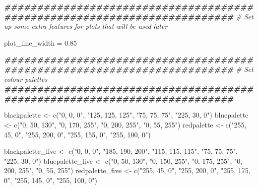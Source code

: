 \documentclass[
]{book}
\newenvironment{Shaded}{\begin{snugshade}}{\end{snugshade}}
\newcommand{\CommentTok}[1]{\textcolor[rgb]{0.56,0.35,0.01}{\textit{#1}}}
\newcommand{\DocumentationTok}[1]{\textcolor[rgb]{0.56,0.35,0.01}{\textbf{\textit{#1}}}}
\newcommand{\FloatTok}[1]{\textcolor[rgb]{0.00,0.00,0.81}{#1}}
\newcommand{\FunctionTok}[1]{\textcolor[rgb]{0.00,0.00,0.00}{#1}}
\newcommand{\NormalTok}[1]{#1}
\newcommand{\OtherTok}[1]{\textcolor[rgb]{0.56,0.35,0.01}{#1}}
\newcommand{\StringTok}[1]{\textcolor[rgb]{0.31,0.60,0.02}{#1}}
\begin{document}
\begin{Shaded}
\begin{Highlighting}[]
\DocumentationTok{\#\#\#\#\#\#\#\#\#\#\#\#\#\#\#\#\#\#\#\#\#\#\#\#\#\#\#\#\#\#\#\#\#\#\#\#\#\#\#\#\#\#\#\#\#\#\#\#\#\#\#\#\#\#\#\#\#\#\#\#\#\#\#\#\#\#\#\#\#\#\#\#\#}
\CommentTok{\# Set up some extra features for plots that will be used later}

\NormalTok{plot\_line\_width }\OtherTok{=} \FloatTok{0.85}

\DocumentationTok{\#\#\#\#\#\#\#\#\#\#\#\#\#\#\#\#\#\#\#\#\#\#\#\#\#\#\#\#\#\#\#\#\#\#\#\#\#\#\#\#\#\#\#\#\#\#\#\#\#\#\#\#\#\#\#\#\#\#\#\#\#\#\#\#\#\#\#\#\#\#\#\#\#}
\CommentTok{\# Set colour palettes}
\DocumentationTok{\#\#\#\#\#\#\#\#\#\#\#\#\#\#\#\#\#\#\#\#\#\#\#\#\#\#\#\#\#\#\#\#\#\#\#\#\#\#\#\#\#\#\#\#\#\#\#\#\#\#\#\#\#\#\#\#\#\#\#\#\#\#\#\#\#\#\#\#\#\#\#\#\#}

\NormalTok{blackpalette }\OtherTok{\textless{}{-}} \FunctionTok{c}\NormalTok{(}\StringTok{"0, 0, 0"}\NormalTok{,}
                  \StringTok{"125, 125, 125"}\NormalTok{,}
                  \StringTok{"75, 75, 75"}\NormalTok{,}
                  \StringTok{"225, 30, 0"}\NormalTok{)}
\NormalTok{bluepalette }\OtherTok{\textless{}{-}} \FunctionTok{c}\NormalTok{(}\StringTok{"0, 50, 130"}\NormalTok{,}
                 \StringTok{"0, 170, 255"}\NormalTok{,}
                 \StringTok{"0, 200, 255"}\NormalTok{,}
                 \StringTok{"0, 55, 255"}\NormalTok{)}
\NormalTok{redpalette }\OtherTok{\textless{}{-}} \FunctionTok{c}\NormalTok{(}\StringTok{"255, 45, 0"}\NormalTok{,}
                \StringTok{"255, 200, 0"}\NormalTok{,}
                \StringTok{"255, 155, 0"}\NormalTok{,}
                \StringTok{"255, 100, 0"}\NormalTok{)}

\NormalTok{blackpalette\_five }\OtherTok{\textless{}{-}} \FunctionTok{c}\NormalTok{(}\StringTok{"0, 0, 0"}\NormalTok{,}
                       \StringTok{"185, 190, 200"}\NormalTok{,}
                       \StringTok{"115, 115, 115"}\NormalTok{,}
                       \StringTok{"75, 75, 75"}\NormalTok{,}
                       \StringTok{"225, 30, 0"}\NormalTok{)}
\NormalTok{bluepalette\_five }\OtherTok{\textless{}{-}} \FunctionTok{c}\NormalTok{(}\StringTok{"0, 50, 130"}\NormalTok{,}
                      \StringTok{"0, 150, 255"}\NormalTok{,}
                      \StringTok{"0, 175, 255"}\NormalTok{,}
                      \StringTok{"0, 200, 255"}\NormalTok{,}
                      \StringTok{"0, 55, 255"}\NormalTok{)}
\NormalTok{redpalette\_five }\OtherTok{\textless{}{-}} \FunctionTok{c}\NormalTok{(}\StringTok{"255, 45, 0"}\NormalTok{,}
                     \StringTok{"255, 200, 0"}\NormalTok{,}
                     \StringTok{"255, 175, 0"}\NormalTok{,}
                     \StringTok{"255, 145, 0"}\NormalTok{,}
                     \StringTok{"255, 100, 0"}\NormalTok{)}


\end{Highlighting}
\end{Shaded}
\end{document}

